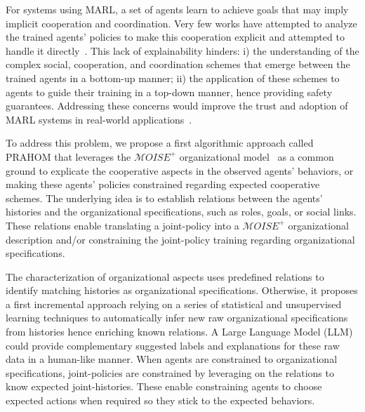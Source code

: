 \documentclass[doubleblind]{ecai}
\newcounter{relation}
\begin{document}
For systems using MARL, a set of agents learn to achieve goals that may imply implicit cooperation and coordination. Very few works have attempted to analyze the trained agents' policies to make this cooperation explicit and attempted to handle it directly~\citep{albrecht2018survey,perolat2017pool}. This lack of explainability hinders: \quad i) the understanding of the complex social, cooperation, and coordination schemes that emerge between the trained agents in a bottom-up manner; \quad ii) the application of these schemes to agents to guide their training in a top-down manner, hence providing safety guarantees.
Addressing these concerns would improve the trust and adoption of MARL systems in real-world applications~\citep{kok2006collaborative,omidshafiei2019learning}.


To address this problem, we propose a first algorithmic approach called PRAHOM that leverages the $\mathcal{M}OISE^+$ organizational model~\citep{Hubner2007} as a common ground to explicate the cooperative aspects in the observed agents' behaviors, or making these agents' policies constrained regarding expected cooperative schemes. The underlying idea is to establish relations between the agents' histories and the organizational specifications, such as roles, goals, or social links. These relations enable translating a joint-policy into a $\mathcal{M}OISE^+$ organizational description and/or constraining the joint-policy training regarding organizational specifications.

The characterization of organizational aspects uses predefined relations to identify matching histories as organizational specifications. Otherwise, it proposes a first incremental approach relying on a series of statistical and unsupervised learning techniques to automatically infer new raw organizational specifications from histories hence enriching known relations. A Large Language Model (LLM) could provide complementary suggested labels and explanations for these raw data in a human-like manner.
When agents are constrained to organizational specifications, joint-policies are constrained by leveraging on the relations to know expected joint-histories. These enable constraining agents to choose expected actions when required so they stick to the expected behaviors.
\end{document}

